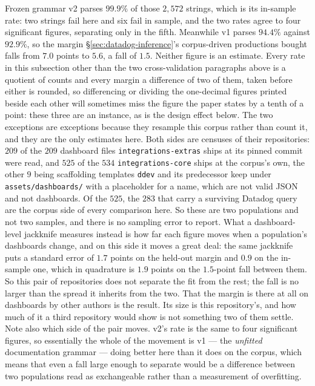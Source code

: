 Frozen grammar v2 parses $99.9\%$ of those $2{,}572$ strings, which is its in-sample
rate: two strings fail here and six fail in sample, and the two rates agree to four
significant figures, separating only in the fifth. Meanwhile v1 parses $94.4\%$ against
$92.9\%$, so the margin \S\ref{sec:datadog-inference}'s corpus-driven productions bought
falls from $7.0$ points to $5.6$, a fall of $1.5$. Neither figure is an estimate.
Every rate in this subsection other than the two cross-validation paragraphs above is
a quotient of counts and every margin a difference of two of them, taken before either
is rounded, so differencing or dividing the one-decimal figures printed beside each
other will sometimes miss the figure the paper states by a tenth of a point: these three
are an instance, as is the design effect below. The two exceptions are exceptions
because they resample this corpus rather than count it, and they are the only estimates
here. Both sides are
censuses of their repositories: $209$ of the $209$ dashboard files
\texttt{integrations-extras} ships at its pinned commit were read, and $525$ of the
$534$ \texttt{integrations-core} ships at the corpus's own, the other $9$ being
scaffolding templates \texttt{ddev} and its predecessor keep under
\texttt{assets/dashboards/} with a placeholder for a name, which are not valid JSON and
not dashboards. Of the $525$, the $283$ that carry a surviving Datadog query are the
corpus side of every comparison here. So these are two populations and not two samples,
and there is no sampling error to report. What a dashboard-level jackknife measures instead is how far
each figure moves when a population's dashboards change, and on this side it moves a
great deal: the same jackknife puts a standard error of $1.7$ points on the held-out
margin and $0.9$ on the in-sample one, which in quadrature is $1.9$ points on the
$1.5$-point fall between them. So this pair of repositories does not separate the fit
from the rest; the fall is no larger than the spread it inherits from the two. That the margin is there at all on dashboards by other authors is the result.
Its size is this repository's, and how much of it a third repository would show is not
something two of them settle. Note also which side of the pair moves. v2's rate is the
same to four significant figures, so essentially the whole of the movement is v1 ---
the \emph{unfitted} documentation grammar --- doing better here than it does on the
corpus, which means that even a fall large enough to separate would be a difference
between two populations read as exchangeable rather than a measurement of overfitting.

